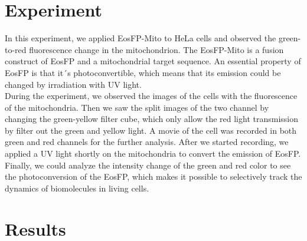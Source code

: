 \documentclass[a4paper,english,12pt,bibliography=totoc]{scrreprt}
\begin{document}
\section{Experiment}
In this experiment, we applied EosFP-Mito to HeLa cells and observed the green-to-red fluorescence change in the mitochondrion. The EosFP-Mito is a fusion construct of EosFP and a mitochondrial target sequence. An essential property of EosFP is that it´s photoconvertible, which means that its emission could be changed by irradiation with UV light. \\

During the experiment, we observed the images of the cells with the fluorescence of the mitochondria. Then we saw the split images of the two channel by changing the green-yellow filter cube, which only allow the red light transmission by filter out the green and yellow light. A movie of the cell was recorded in both green and red channels for the further analysis. After we started recording, we applied a UV light shortly on the mitochondria to convert the emission of EosFP.  Finally, we could analyze the intensity change of the green and red color to see the photoconversion of the EosFP, which makes it possible to selectively track the dynamics of biomolecules in living cells.
\section{Results}
\end{document}
